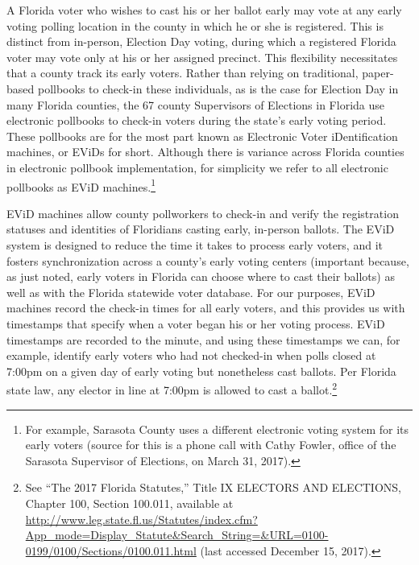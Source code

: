 \documentclass[12pt,titlepage]{article}
\begin{document}

A Florida voter who wishes to cast his or her ballot early may vote at
any early voting polling location in the county in which he or she is
registered.  This is distinct from in-person, Election Day voting,
during which a registered Florida voter may vote only at his or her
assigned precinct.  This flexibility necessitates that a county track
its early voters.  Rather than relying on traditional, paper-based
pollbooks to check-in these individuals, as is the case for Election
Day in many Florida counties, the 67 county Supervisors of Elections
in Florida use electronic pollbooks to check-in voters during the
state's early voting period.  These pollbooks are for the most part
known as Electronic Voter iDentification machines, or EViDs for short.
Although there is variance across Florida counties in electronic
pollbook implementation, for simplicity we refer to all electronic
pollbooks as EViD machines.\footnote{For example, Sarasota County uses
  a different electronic voting system for its early voters (source
  for this is a phone call with Cathy Fowler, office of the Sarasota
  Supervisor of Elections, on March 31, 2017).}


EViD machines allow county pollworkers to check-in and verify the
registration statuses and identities of Floridians casting early,
in-person ballots. The EViD system is designed to reduce the time it
takes to process early voters, and it fosters synchronization across a
county's early voting centers (important because, as just noted, early
voters in Florida can choose where to cast their ballots) as well as
with the Florida statewide voter database.  For our purposes, EViD
machines record the check-in times for all early voters, and this
provides us with timestamps that specify when a voter began his or her
voting process. EViD timestamps are recorded to the minute, and using
these timestamps we can, for example, identify early voters who had
not checked-in when polls closed at 7:00pm on a given day of early
voting but nonetheless cast ballots.  Per Florida state law, any
elector in line at 7:00pm is allowed to cast a ballot.\footnote{See
  ``The 2017 Florida Statutes,'' Title IX ELECTORS AND ELECTIONS,
  Chapter 100, Section 100.011, available at
  \url{http://www.leg.state.fl.us/Statutes/index.cfm?App\_mode=Display\_Statute\&Search\_String=\&URL=0100-0199/0100/Sections/0100.011.html}
  (last accessed December 15, 2017).}
\end{document}
